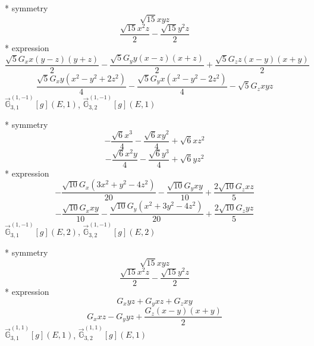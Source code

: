 \documentclass[fleqn,8pt]{jsarticle}
\begin{document}
\noindent\quad ** symmetry
\begin{dmath*}
\sqrt{15} x y z
\end{dmath*}
\begin{dmath*}
\frac{\sqrt{15} x^{2} z}{2} - \frac{\sqrt{15} y^{2} z}{2}
\end{dmath*}
\noindent\quad ** expression
\begin{dmath*}
\frac{\sqrt{5} G_{x} x \left(y - z\right) \left(y + z\right)}{2} - \frac{\sqrt{5} G_{y} y \left(x - z\right) \left(x + z\right)}{2} + \frac{\sqrt{5} G_{z} z \left(x - y\right) \left(x + y\right)}{2}
\end{dmath*}
\begin{dmath*}
\frac{\sqrt{5} G_{x} y \left(x^{2} - y^{2} + 2 z^{2}\right)}{4} - \frac{\sqrt{5} G_{y} x \left(x^{2} - y^{2} - 2 z^{2}\right)}{4} - \sqrt{5} G_{z} x y z
\end{dmath*}
\noindent\quad $\vec{\mathbb{G}}_{3,1}^{(1,-1)}[g](E,1)$, $\vec{\mathbb{G}}_{3,2}^{(1,-1)}[g](E,1)$

\noindent\quad ** symmetry
\begin{dmath*}
- \frac{\sqrt{6} x^{3}}{4} - \frac{\sqrt{6} x y^{2}}{4} + \sqrt{6} x z^{2}
\end{dmath*}
\begin{dmath*}
- \frac{\sqrt{6} x^{2} y}{4} - \frac{\sqrt{6} y^{3}}{4} + \sqrt{6} y z^{2}
\end{dmath*}
\noindent\quad ** expression
\begin{dmath*}
- \frac{\sqrt{10} G_{x} \left(3 x^{2} + y^{2} - 4 z^{2}\right)}{20} - \frac{\sqrt{10} G_{y} x y}{10} + \frac{2 \sqrt{10} G_{z} x z}{5}
\end{dmath*}
\begin{dmath*}
- \frac{\sqrt{10} G_{x} x y}{10} - \frac{\sqrt{10} G_{y} \left(x^{2} + 3 y^{2} - 4 z^{2}\right)}{20} + \frac{2 \sqrt{10} G_{z} y z}{5}
\end{dmath*}
\noindent\quad $\vec{\mathbb{G}}_{3,1}^{(1,-1)}[g](E,2)$, $\vec{\mathbb{G}}_{3,2}^{(1,-1)}[g](E,2)$

\noindent\quad ** symmetry
\begin{dmath*}
\sqrt{15} x y z
\end{dmath*}
\begin{dmath*}
\frac{\sqrt{15} x^{2} z}{2} - \frac{\sqrt{15} y^{2} z}{2}
\end{dmath*}
\noindent\quad ** expression
\begin{dmath*}
G_{x} y z + G_{y} x z + G_{z} x y
\end{dmath*}
\begin{dmath*}
G_{x} x z - G_{y} y z + \frac{G_{z} \left(x - y\right) \left(x + y\right)}{2}
\end{dmath*}
\noindent\quad $\vec{\mathbb{G}}_{3,1}^{(1,1)}[g](E,1)$, $\vec{\mathbb{G}}_{3,2}^{(1,1)}[g](E,1)$
\end{document}

